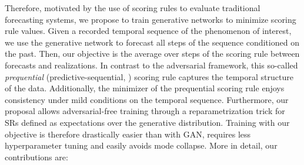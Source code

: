 \documentclass[twoside,11pt]{article}
\begin{document}
	Therefore, motivated by the use of scoring rules to evaluate traditional forecasting systems, we propose to train generative networks to minimize scoring rule values. Given a recorded temporal sequence of the phenomenon of interest, we use the generative network to forecast all steps of the sequence conditioned on the past. Then, our objective is the average over steps of the scoring rule between forecasts and realizations.
	In contrast to the adversarial framework, this so-called \textit{prequential} (predictive-sequential, \citealp{dawid1984present}) scoring rule captures the temporal structure of the data. Additionally, the minimizer of the prequential scoring rule enjoys consistency under mild conditions on the temporal sequence.
	Furthermore,
	our proposal allows adversarial-free training through a reparametrization trick \citep{kingma2013auto} for SRs defined as expectations over the generative distribution. Training with our objective is therefore drastically easier than with GAN, requires less hyperparameter tuning and easily avoids mode collapse.
	More in detail, our contributions are:
\end{document}
